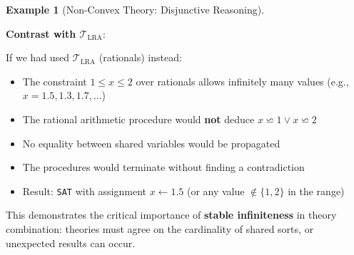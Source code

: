 \documentclass[11pt,a4paper]{article}
\theoremstyle{definition}
\newtheorem{example}{Example}[section]
\theoremstyle{plain}
\theoremstyle{remark}
\begin{document}
\begin{example}[Non-Convex Theory: Disjunctive Reasoning]
\begin{tcolorbox}[colback=purple!5!white,colframe=purple!75!black,title=\textbf{Example 3: Non-Convex $\mathcal{T}_{\text{LIA}}$ with Disjunctions},breakable]
\begin{center}
\end{center}

\vspace{0.5em}

\textbf{Contrast with $\mathcal{T}_{\text{LRA}}$}:

If we had used $\mathcal{T}_{\text{LRA}}$ (rationals) instead:
\begin{itemize}
    \item The constraint $1 \leq x \leq 2$ over rationals allows infinitely many values (e.g., $x = 1.5, 1.3, 1.7, \ldots$)
    \item The rational arithmetic procedure would \textbf{not} deduce $x \backsimeq 1 \vee x \backsimeq 2$
    \item No equality between shared variables would be propagated
    \item The procedures would terminate without finding a contradiction
    \item Result: \texttt{SAT} with assignment $x \leftarrow 1.5$ (or any value $\notin \{1, 2\}$ in the range)
\end{itemize}

This demonstrates the critical importance of \textbf{stable infiniteness} in theory combination: theories must agree on the cardinality of shared sorts, or unexpected results can occur.
\end{tcolorbox}
\end{example}

\newpage
\end{document}
